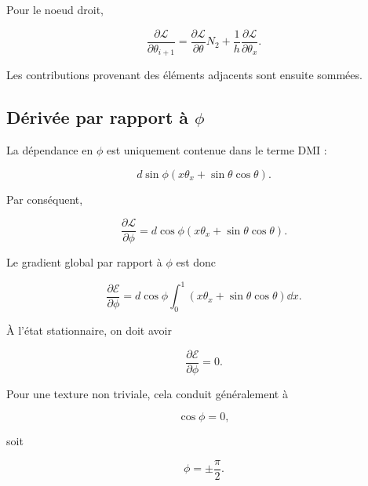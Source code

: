 \documentclass[a4paper,11pt]{article}
\begin{document}
Pour le noeud droit,

\begin{equation}
\boxed{
\frac{\partial\mathcal L}{\partial\theta_{i+1}}
=
\frac{\partial\mathcal L}{\partial\theta}N_2
+
\frac{1}{h}
\frac{\partial\mathcal L}{\partial\theta_x}.
}
\end{equation}

Les contributions provenant des éléments adjacents sont ensuite sommées.

\subsection{Dérivée par rapport à $\phi$}

La dépendance en $\phi$ est uniquement contenue dans le terme DMI :

\begin{equation}
d\sin\phi
\left(
x\theta_x+\sin\theta\cos\theta
\right).
\end{equation}

Par conséquent,

\begin{equation}
\boxed{
\frac{\partial\mathcal L}{\partial\phi}
=
d\cos\phi
\left(
x\theta_x
+
\sin\theta\cos\theta
\right).
}
\end{equation}

Le gradient global par rapport à $\phi$ est donc

\begin{equation}
\boxed{
\frac{\partial\mathcal E}{\partial\phi}
=
d\cos\phi
\int_0^1
\left(
x\theta_x
+
\sin\theta\cos\theta
\right)
\dd x.
}
\end{equation}

À l'état stationnaire, on doit avoir

\begin{equation}
\frac{\partial\mathcal E}{\partial\phi}=0.
\end{equation}

Pour une texture non triviale, cela conduit généralement à

\begin{equation}
\cos\phi=0,
\end{equation}

soit

\begin{equation}
\boxed{
\phi=\pm\frac{\pi}{2}.
}
\end{equation}
\end{document}
